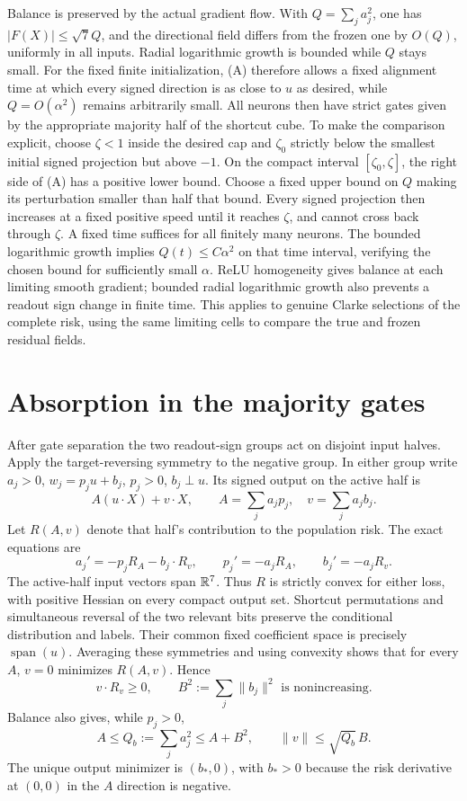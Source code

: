 \documentclass[11pt]{article}
\begin{document}
Balance is preserved by the actual gradient flow. With
$Q=\sum_j a_j^2$, one has $|F(X)|\le\sqrt7 Q$, and the directional
field differs from the frozen one by $O(Q)$, uniformly in all inputs.
Radial logarithmic growth is bounded while $Q$ stays small. For the
fixed finite initialization, (A) therefore allows a fixed alignment
time at which every signed direction is as close to $u$ as desired,
while $Q=O(\alpha^2)$ remains arbitrarily small. All neurons then have
strict gates given by the appropriate majority half of the shortcut
cube. To make the comparison explicit, choose $\zeta<1$ inside the desired
cap and $\zeta_0$ strictly below the smallest initial signed projection
but above $-1$. On the compact interval $[\zeta_0,\zeta]$, the right
side of (A) has a positive lower bound. Choose a fixed upper bound on
$Q$ making its perturbation smaller than half that bound. Every signed
projection then increases at a fixed positive speed until it reaches
$\zeta$, and cannot cross back through $\zeta$. A fixed time suffices
for all finitely many neurons. The bounded logarithmic growth implies
$Q(t)\le C\alpha^2$ on that time interval, verifying the chosen bound
for sufficiently small $\alpha$. ReLU homogeneity gives balance at
each limiting smooth gradient; bounded radial logarithmic growth also
prevents a readout sign change in finite time. This applies to genuine
Clarke selections of the complete risk, using the same limiting cells
to compare the true and frozen residual fields.

\section{Absorption in the majority gates}
After gate separation the two readout-sign groups act on disjoint input
halves. Apply the target-reversing symmetry to the negative group. In
either group write $a_j>0$, $w_j=p_j u+b_j$, $p_j>0$, $b_j\perp u$.
Its signed output on the active half is
\[
 A(u\cdot X)+v\cdot X,\qquad
 A=\sum_j a_jp_j,\quad v=\sum_j a_jb_j.
\]
Let $R(A,v)$ denote that half's contribution to the population risk.
The exact equations are
\[
 a_j'=-p_jR_A-b_j\cdot R_v,\qquad
 p_j'=-a_jR_A,\qquad b_j'=-a_jR_v.\tag{F}
\]
The active-half input vectors span $\mathbb R^7$. Thus $R$ is strictly convex
for either loss, with positive Hessian on every compact output set.
Shortcut permutations and simultaneous reversal of the two relevant
bits preserve the conditional distribution and labels. Their common
fixed coefficient space is precisely $\operatorname{span}(u)$.
Averaging these symmetries and using convexity shows that for every $A$,
$v=0$ minimizes $R(A,v)$. Hence
\[
 v\cdot R_v\ge0,\qquad
 B^2:=\sum_j\|b_j\|^2\text{ is nonincreasing}.
\]
Balance also gives, while $p_j>0$,
\[
 A\le Q_b:=\sum_j a_j^2\le A+B^2,
 \qquad \|v\|\le\sqrt{Q_b}\,B.\tag{B}
\]
The unique output minimizer is $(b_*,0)$, with $b_*>0$ because the
risk derivative at $(0,0)$ in the $A$ direction is negative.
\end{document}
